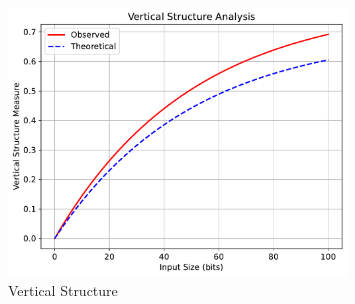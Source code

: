 \begin{figure}[ht]
\centering
\includegraphics[width=0.8\textwidth]{figures/vertical_structure.pdf}
\caption{Vertical Structure}
\label{fig:vertical_structure_intro}
\end{figure} 